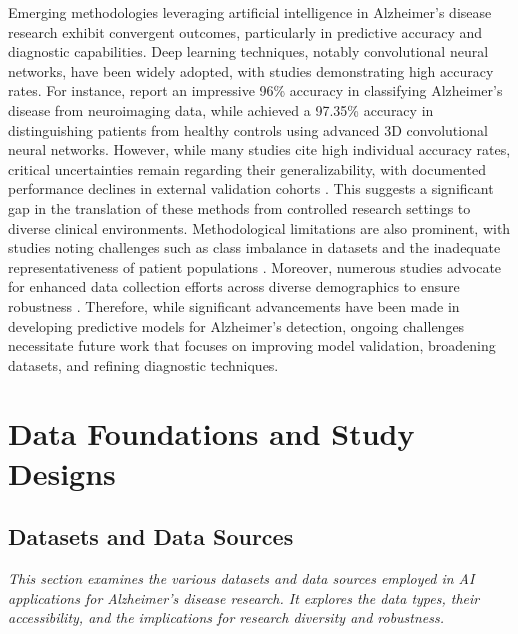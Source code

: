\documentclass{MITcsail}
\begin{document}
Emerging methodologies leveraging artificial intelligence in Alzheimer's disease research exhibit convergent outcomes, particularly in predictive accuracy and diagnostic capabilities. Deep learning techniques, notably convolutional neural networks, have been widely adopted, with studies demonstrating high accuracy rates. For instance, \citet{ref_10_3389_fpubh_2022_834032} report an impressive 96\% accuracy in classifying Alzheimer's disease from neuroimaging data, while \citet{ref_10_1016_j_mri_2021_02_001} achieved a 97.35\% accuracy in distinguishing patients from healthy controls using advanced 3D convolutional neural networks. However, while many studies cite high individual accuracy rates, critical uncertainties remain regarding their generalizability, with documented performance declines in external validation cohorts \citep{ref_10_1016_j_neuroimage_2020_117203,ref_10_1016_j_nicl_2021_102712}. This suggests a significant gap in the translation of these methods from controlled research settings to diverse clinical environments. Methodological limitations are also prominent, with studies noting challenges such as class imbalance in datasets \citep{ref_10_1109_access_2021_3090474} and the inadequate representativeness of patient populations \citep{ref_10_1002_alz_13390}. Moreover, numerous studies advocate for enhanced data collection efforts across diverse demographics to ensure robustness \citep{ref_10_1016_s2589_7500_22_00169_8}. Therefore, while significant advancements have been made in developing predictive models for Alzheimer's detection, ongoing challenges necessitate future work that focuses on improving model validation, broadening datasets, and refining diagnostic techniques.

\section{Data Foundations and Study Designs}

\subsection{Datasets and Data Sources}

\textit{This section examines the various datasets and data sources employed in AI applications for Alzheimer's disease research. It explores the data types, their accessibility, and the implications for research diversity and robustness.}
\end{document}
